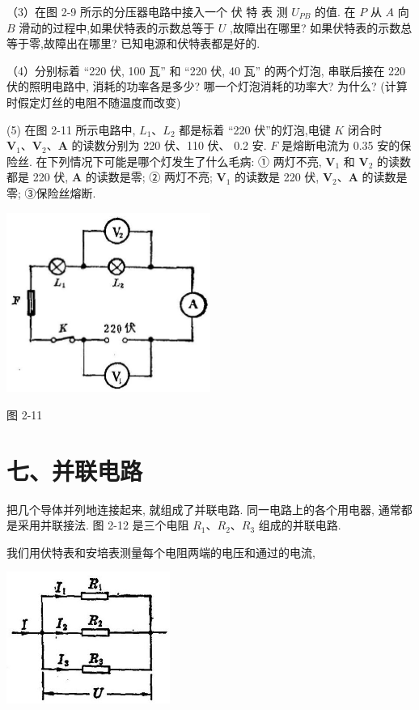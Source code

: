 \documentclass[10pt]{article}
\begin{document}
（3）在图 2-9 所示的分压器电路中接入一个 伏 特 表 测 \({U}_{PB}\) 的值. 在 \(P\) 从 \(A\) 向 \(B\) 滑动的过程中,如果伏特表的示数总等于 \(U\) ,故障出在哪里? 如果伏特表的示数总等于零,故障出在哪里? 已知电源和伏特表都是好的.

（4）分别标着 “220 伏, 100 瓦” 和 “220 伏, 40 瓦” 的两个灯泡, 串联后接在 220 伏的照明电路中, 消耗的功率各是多少? 哪一个灯泡消耗的功率大? 为什么? (计算时假定灯丝的电阻不随温度而改变)

(5) 在图 2-11 所示电路中, \({L}_{1}\text{、}{L}_{2}\) 都是标着 “220 伏”的灯泡,电键 \(K\) 闭合时 \({\mathbf{V}}_{1}\text{、}{\mathbf{V}}_{2}\text{、}\mathbf{A}\) 的读数分别为 220 伏、110 伏、 0.2 安. \(F\) 是熔断电流为 0.35 安的保险丝. 在下列情况下可能是哪个灯发生了什么毛病: ① 两灯不亮, \({\mathbf{V}}_{1}\) 和 \({\mathbf{V}}_{2}\) 的读数都是 220 伏, \(\mathbf{A}\) 的读数是零; ② 两灯不亮; \({\mathbf{V}}_{1}\) 的读数是 220 伏, \({\mathbf{V}}_{2}\text{、}\mathbf{A}\) 的读数是零; ③保险丝熔断.

\begin{center}
\includegraphics[max width=0.5\textwidth]{images/01913056-1f15-74d8-9184-9aab52c9d66b_76_755204.jpg}
\end{center}

图 2-11

\section*{七、并联电路}

把几个导体并列地连接起来, 就组成了并联电路. 同一电路上的各个用电器, 通常都是采用并联接法. 图 2-12 是三个电阻 \({R}_{1}\text{、}{R}_{2}\text{、}{R}_{3}\) 组成的并联电路.

我们用伏特表和安培表测量每个电阻两端的电压和通过的电流,

\begin{center}
\includegraphics[max width=0.4\textwidth]{images/01913056-1f15-74d8-9184-9aab52c9d66b_77_819862.jpg}
\end{center}
\end{document}
